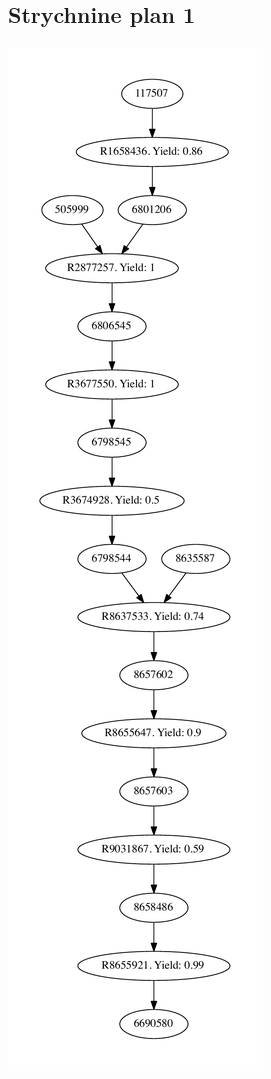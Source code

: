 \documentclass[a4paper,10pt,titlepage]{paper}
\begin{document}
\subsection{Strychnine plan 1}
\centering
\includegraphics[scale=0.4]{Synteseplaner/Strychnine/plan1.pdf}
\label{Appendix::Strychnine1}
\end{document}
